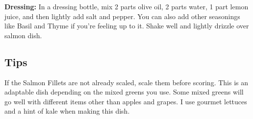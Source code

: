 \textbf{Dressing: } In a dressing bottle, mix 2 parts olive oil, 2 parts water, 1 part lemon juice, and then lightly add salt and pepper. You can also add other seasonings like Basil and Thyme if you're feeling up to it. Shake well and lightly drizzle over salmon dish.

\subsection*{Tips}
If the Salmon Fillets are not already scaled, scale them before scoring. This is an adaptable dish depending on the mixed greens you use. Some mixed greens will go well with different items other than apples and grapes. I use gourmet lettuces and a hint of kale when making this dish.
